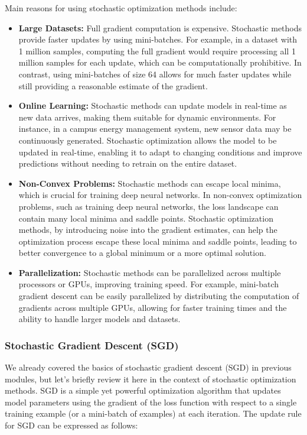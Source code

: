 \documentclass[
  letterpaper,
  DIV=11,
  numbers=noendperiod]{scrreprt}
\begin{document}
Main reasons for using stochastic optimization methods include:

\begin{itemize}
\item
  \textbf{Large Datasets:} Full gradient computation is expensive.
  Stochastic methods provide faster updates by using mini-batches. For
  example, in a dataset with 1 million samples, computing the full
  gradient would require processing all 1 million samples for each
  update, which can be computationally prohibitive. In contrast, using
  mini-batches of size 64 allows for much faster updates while still
  providing a reasonable estimate of the gradient.
\item
  \textbf{Online Learning:} Stochastic methods can update models in
  real-time as new data arrives, making them suitable for dynamic
  environments. For instance, in a campus energy management system, new
  sensor data may be continuously generated. Stochastic optimization
  allows the model to be updated in real-time, enabling it to adapt to
  changing conditions and improve predictions without needing to retrain
  on the entire dataset.
\item
  \textbf{Non-Convex Problems:} Stochastic methods can escape local
  minima, which is crucial for training deep neural networks. In
  non-convex optimization problems, such as training deep neural
  networks, the loss landscape can contain many local minima and saddle
  points. Stochastic optimization methods, by introducing noise into the
  gradient estimates, can help the optimization process escape these
  local minima and saddle points, leading to better convergence to a
  global minimum or a more optimal solution.
\item
  \textbf{Parallelization:} Stochastic methods can be parallelized
  across multiple processors or GPUs, improving training speed. For
  example, mini-batch gradient descent can be easily parallelized by
  distributing the computation of gradients across multiple GPUs,
  allowing for faster training times and the ability to handle larger
  models and datasets.
\end{itemize}

\subsubsection{Stochastic Gradient Descent
(SGD)}\label{stochastic-gradient-descent-sgd}

We already covered the basics of stochastic gradient descent (SGD) in
previous modules, but let's briefly review it here in the context of
stochastic optimization methods. SGD is a simple yet powerful
optimization algorithm that updates model parameters using the gradient
of the loss function with respect to a single training example (or a
mini-batch of examples) at each iteration. The update rule for SGD can
be expressed as follows:
\end{document}
